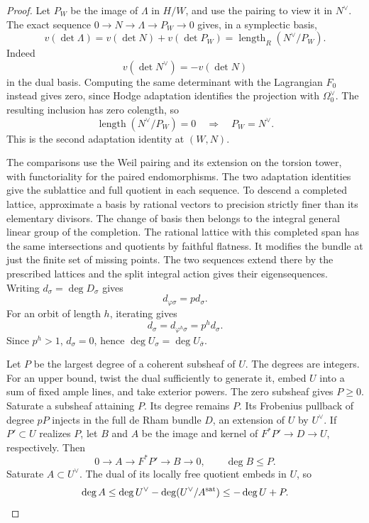 \begin{proof}
Let \(P_W\) be the image of \(\Lambda\) in \(H/W\), and
use the pairing to view it in \(N^\vee\). The exact sequence
\(0\to N\to\Lambda\to P_W\to0\) gives, in a symplectic basis,
\[
 v(\det\Lambda)=v(\det N)+v(\det P_W)
       =\operatorname{length}_R(N^\vee/P_W).
\]
Indeed
\[
 v(\det N^\vee)=-v(\det N)
\]
in the dual basis.
Computing the same determinant with the Lagrangian \(F_0\)
instead gives zero, since Hodge adaptation identifies the
projection with \(\Omega_0^\vee\). The resulting inclusion has zero colength, so
\[
 \operatorname{length}(N^\vee/P_W)=0\quad\Longrightarrow\quad P_W=N^\vee.
\]
This is the second adaptation identity
at \((W,N)\).

The comparisons use the Weil pairing and its extension on the
torsion tower, with functoriality for the paired endomorphisms.
The two adaptation identities give the sublattice and full
quotient in each sequence. To descend a
completed lattice, approximate a basis by rational vectors to
precision strictly finer than its elementary divisors. The change
of basis then belongs to the integral general linear group of
the completion. The rational lattice with this completed span
has the same intersections and quotients by faithful flatness.
It modifies the bundle at just the finite set of missing points.
The two sequences extend there by the prescribed lattices and
the split integral action gives their eigensequences.
\label{cor:flag-wall-positivity-7}
Writing \(d_\sigma=\deg D_\sigma\) gives
\[
 d_{\varphi\sigma}=p d_\sigma.
\]
For an orbit of length \(h\), iterating gives
\[
 d_\sigma=d_{\varphi^h\sigma}=p^h d_\sigma .
\]
Since \(p^h>1\), \(d_\sigma=0\), hence
\(\deg U_\sigma=\deg U_{\bar\sigma}\).

Let \(P\) be the largest degree of a coherent subsheaf of \(U\).
The degrees are integers. For an upper bound, twist the
dual sufficiently to generate it, embed \(U\) into a sum of fixed
ample lines, and take exterior powers. The zero subsheaf gives
\(P\ge0\). Saturate a subsheaf attaining \(P\). Its degree remains
\(P\). Its Frobenius pullback of degree \(pP\) injects in the full
de Rham bundle \(D\), an extension of \(U\) by \(U^\vee\).
If \(P'\subset U\) realizes \(P\), let \(B\) and \(A\) be
the image and kernel of \(F^*P'\to D\to U\), respectively.
Then \[
 0\to A\to F^*P'\to B\to0,\qquad \deg B\le P.
\]
Saturate \(A\subset U^\vee\). The dual of its locally free
quotient embeds in \(U\), so
\[
 \deg A\le\deg U^\vee-\deg(U^\vee/A^{\rm sat})
                  \le-\deg U+P .
\]


\end{proof}
